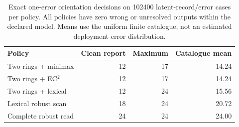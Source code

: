 \begin{table}[!htbp]\centering
\caption{Exact one-error orientation decisions on 102400 latent-record/error cases per policy. All policies have zero wrong or unresolved outputs within the declared model. Means use the uniform finite catalogue, not an estimated deployment error distribution.}
\label{tab:robustorientation}
\begin{tabular}{lrrr}\toprule
Policy & Clean report & Maximum & Catalogue mean \\\midrule
Two rings + minimax & 12 & 17 & 14.24 \\
Two rings + EC$^2$ & 12 & 17 & 14.24 \\
Two rings + lexical & 12 & 24 & 15.56 \\
Lexical robust scan & 18 & 24 & 20.72 \\
Complete robust read & 24 & 24 & 24.00 \\
\bottomrule\end{tabular}
\end{table}
